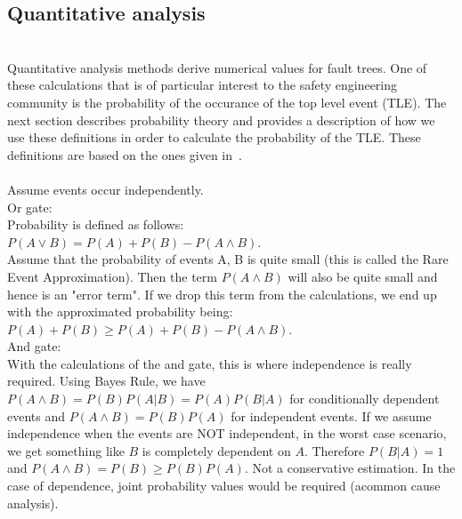 \subsection{Quantitative analysis}
\\

Quantitative analysis methods derive numerical values for fault trees. One of these calculations that is of particular interest to the safety engineering community is the probability of the occurance of the top level event (TLE). The next section describes probability theory and provides a description of how we use these definitions in order to calculate the probability of the TLE. These definitions are based on the ones given in~\cite{RuijtersSurvey}.\\

\\
Assume events occur independently. \\

Or gate: \\
Probability is defined as follows: \\
$P(A \lor B) = P(A) + P(B) - P(A \land B)$. \\
Assume that the probability of events A, B is quite small (this is called the Rare Event Approximation). Then the term $P(A \land B)$ will also be quite small and hence is an "error term". If we drop this term from the calculations, we end up with the approximated probability being: $P(A) + P(B) \geq P(A) + P(B) - P(A \land B)$. \\

And gate: \\
With the calculations of the and gate, this is where independence is really required. Using Bayes Rule, we have $P(A \land B) = P(B)P(A|B) = P(A)P(B|A)$ for conditionally dependent events and $P(A \land B) = P(B)P(A)$ for independent events. If we assume independence when the events are NOT independent, in the worst case scenario, we get something like $B$ is completely dependent on $A$. Therefore $P(B|A) = 1$ and $P(A \land B) = P(B) \geq P(B)P(A)$. Not a conservative estimation. In the case of dependence, joint probability values would be required (acommon cause analysis).  \\







